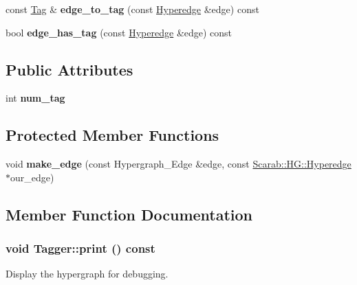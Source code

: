\begin{DoxyCompactItemize}
\item 
\hypertarget{class_tagger_ad615c8356f380baab01ae6675a25c409}{
const \hyperlink{struct_tag}{Tag} \& {\bfseries edge\_\-to\_\-tag} (const \hyperlink{class_scarab_1_1_h_g_1_1_hyperedge}{Hyperedge} \&edge) const }
\label{class_tagger_ad615c8356f380baab01ae6675a25c409}

\item 
\hypertarget{class_tagger_ad7f1dda6082e71cd113a3d77e9c33275}{
bool {\bfseries edge\_\-has\_\-tag} (const \hyperlink{class_scarab_1_1_h_g_1_1_hyperedge}{Hyperedge} \&edge) const }
\label{class_tagger_ad7f1dda6082e71cd113a3d77e9c33275}

\end{DoxyCompactItemize}
\subsection*{Public Attributes}
\begin{DoxyCompactItemize}
\item 
\hypertarget{class_tagger_a4bf3332c608c078cbb2d5692c4f13b43}{
int {\bfseries num\_\-tag}}
\label{class_tagger_a4bf3332c608c078cbb2d5692c4f13b43}

\end{DoxyCompactItemize}
\subsection*{Protected Member Functions}
\begin{DoxyCompactItemize}
\item 
\hypertarget{class_tagger_a305fd4cf75f2149a57109772e195eb47}{
void {\bfseries make\_\-edge} (const Hypergraph\_\-Edge \&edge, const \hyperlink{class_scarab_1_1_h_g_1_1_hyperedge}{Scarab::HG::Hyperedge} $\ast$our\_\-edge)}
\label{class_tagger_a305fd4cf75f2149a57109772e195eb47}

\end{DoxyCompactItemize}


\subsection{Member Function Documentation}
\hypertarget{class_tagger_a4ebe0aebd7c0392970b401a5a6c6cd72}{
\subsubsection[{print}]{\setlength{\rightskip}{0pt plus 5cm}void Tagger::print () const}}
\label{class_tagger_a4ebe0aebd7c0392970b401a5a6c6cd72}
Display the hypergraph for debugging. 

